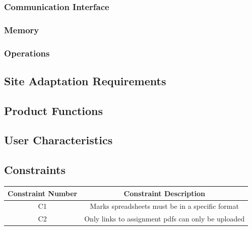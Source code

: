 \documentclass[a4paper,12pt]{article}
\begin{document}
            \subsubsection{Communication Interface}
            
            \subsubsection{Memory}
            
            \subsubsection{Operations}
            
            \subsection{Site Adaptation Requirements}
            
        \subsection{Product Functions}
        
        \subsection{User Characteristics}
        
        \subsection{Constraints}
               \begin{center}
        	\begin{tabular}{ |c|c| } 
        		\hline
        		Constraint Number & Constraint Description \\
        		\hline
        		C1 & Marks spreadsheets must be in a specific format \\
        		\hline
        		C2 & Only links to assignment pdfs can only be uploaded  \\
        		\hline
        		
        	\end{tabular}
        \end{center}
\end{document}
